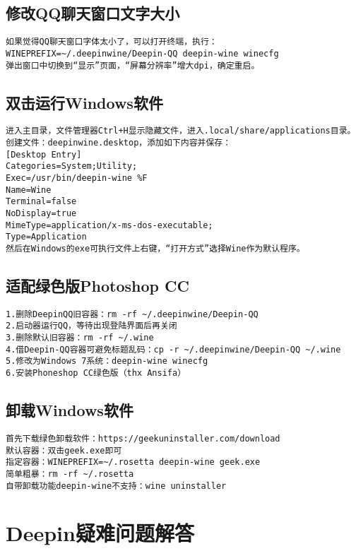 \documentclass[a4paper,fontset=fandol,zihao=-4,linespread=1.2]{ctexbook}
\begin{document}
\section{修改QQ聊天窗口文字大小}
\begin{lstlisting}
如果觉得QQ聊天窗口字体太小了，可以打开终端，执行：
WINEPREFIX=~/.deepinwine/Deepin-QQ deepin-wine winecfg
弹出窗口中切换到“显示”页面，“屏幕分辨率”增大dpi，确定重启。
\end{lstlisting}

\section{双击运行Windows软件}
\begin{lstlisting}
进入主目录，文件管理器Ctrl+H显示隐藏文件，进入.local/share/applications目录。
创建文件：deepinwine.desktop，添加如下内容并保存：
[Desktop Entry]
Categories=System;Utility;
Exec=/usr/bin/deepin-wine %F
Name=Wine
Terminal=false
NoDisplay=true
MimeType=application/x-ms-dos-executable;
Type=Application
然后在Windows的exe可执行文件上右键，“打开方式”选择Wine作为默认程序。
\end{lstlisting}

\section{适配绿色版Photoshop CC}
\begin{lstlisting}
1.删除DeepinQQ旧容器：rm -rf ~/.deepinwine/Deepin-QQ
2.启动器运行QQ，等待出现登陆界面后再关闭
3.删除默认旧容器：rm -rf ~/.wine
4.借Deepin-QQ容器可避免标题乱码：cp -r ~/.deepinwine/Deepin-QQ ~/.wine
5.修改为Windows 7系统：deepin-wine winecfg
6.安装Phoneshop CC绿色版（thx Ansifa）
\end{lstlisting}

\section{卸载Windows软件}
\begin{lstlisting}
首先下载绿色卸载软件：https://geekuninstaller.com/download
默认容器：双击geek.exe即可
指定容器：WINEPREFIX=~/.rosetta deepin-wine geek.exe
简单粗暴：rm -rf ~/.rosetta
自带卸载功能deepin-wine不支持：wine uninstaller
\end{lstlisting}


\chapter{Deepin疑难问题解答}
\end{document}

